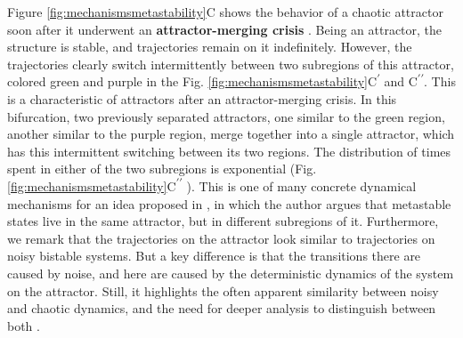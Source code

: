 \documentclass[reprint,onecolumn,superscriptaddress,showpacs,amsmath,amssymb,aps,floatfix]{revtex4-2}
\theoremstyle{definition}
\newcommand{\Emph}[1]{\textbf{#1}}
\newcommand*{\everymodeprime}{\ensuremath{\prime}}
\begin{document}
Figure \ref{fig:mechanismsmetastability}C shows the behavior of a chaotic attractor soon after it underwent an \Emph{attractor-merging crisis} \cite{grebogi1983crises}. Being an attractor, the structure is stable, and trajectories remain on it indefinitely. However, the trajectories clearly switch intermittently between two subregions of this attractor, colored green and purple in the Fig. \ref{fig:mechanismsmetastability}C\textsuperscript{\everymodeprime} and C\textsuperscript{\everymodeprime\everymodeprime}. This is a characteristic of attractors after an attractor-merging crisis. In this bifurcation, two previously separated attractors, one similar to the green region, another similar to the purple region, merge together into a single attractor, which has this intermittent switching between its two regions. The distribution of times spent in either of the two subregions is exponential (Fig. \ref{fig:mechanismsmetastability}C\textsuperscript{\everymodeprime\everymodeprime} ). 
This is one of many concrete dynamical mechanisms for an idea proposed in \cite{friston2000transients}, in which the author argues that metastable states live in the same attractor, but in different subregions of it. 
Furthermore, we remark that the trajectories on the attractor look similar to trajectories on noisy bistable systems. But a key difference is that the transitions there are caused by noise, and here are caused by the deterministic dynamics of the system on the attractor. Still, it highlights the often apparent similarity between noisy and chaotic dynamics, and the need for deeper analysis to distinguish between both \cite{boaretto2021discriminating}.
\end{document}
